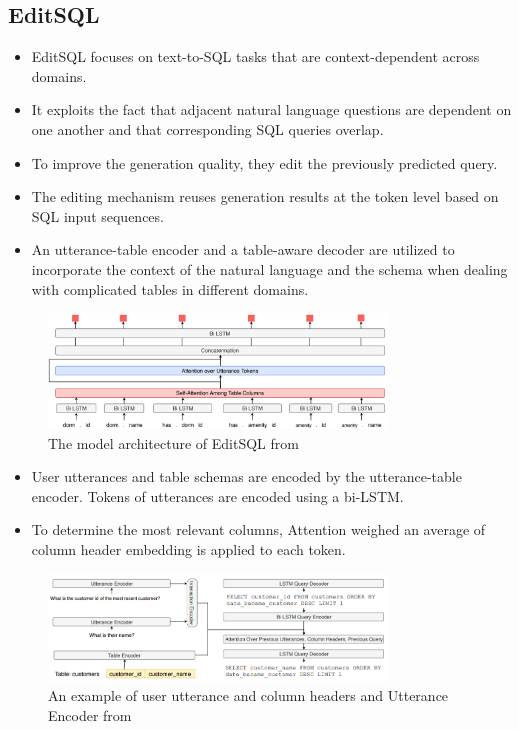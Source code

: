 \subsection*{EditSQL}

\begin{itemize}
    \item EditSQL focuses on text-to-SQL tasks that are context-dependent across domains.
    \item It exploits the fact that adjacent natural language questions are dependent on one another and that corresponding SQL queries overlap.
    \item To improve the generation quality, they edit the previously predicted query.
    \item The editing mechanism reuses generation results at the token level based on SQL input sequences.
    \item An utterance-table encoder and a table-aware decoder are utilized to incorporate the context of the natural language and the schema when dealing with complicated tables in different domains.
\end{itemize}

\begin{figure}[htb]
    \centering
    \includegraphics[width=0.8\textwidth]{pics/EditSQL/Table.png}
    \caption{The model architecture of EditSQL from \cite{DBLP:journals/corr/abs-1909-00786}}
    \label{fig:EditSQL}
\end{figure}


\begin{itemize}
    \item User utterances and table schemas are encoded by the utterance-table encoder. Tokens of utterances are encoded using a bi-LSTM.
    \item To determine the most relevant columns, Attention weighed an average of column header embedding is applied to each token.
\end{itemize}

\begin{figure}[htb]
    \centering
    \includegraphics[width=0.8\textwidth]{pics/EditSQL/model.png}
    \caption{An example of user utterance and column headers and Utterance Encoder from \cite{DBLP:journals/corr/abs-1909-00786}}
    \label{fig:EditSQL_model}
\end{figure}

